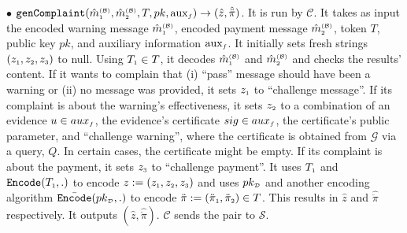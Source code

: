 \begin{definition}
\item  [$\bullet$] $\mathtt{genComplaint}(\hat m^{\scriptscriptstyle\mathcal{(B)}}_{\scriptscriptstyle 1}, \hat m^{\scriptscriptstyle\mathcal{(B)}}_{\scriptscriptstyle2}, T, pk, \text{aux}_{\scriptscriptstyle f})\rightarrow (\hat z, \hat{\ddot \pi})$. It is run by $\mathcal{C}$. It takes as input   the encoded warning message $\hat m^{\scriptscriptstyle\mathcal{(B)}}_{\scriptscriptstyle1}$, encoded payment message $\hat m^{\scriptscriptstyle\mathcal{(B)}}_{\scriptscriptstyle2}$,  token $T$, public key $pk$, and  auxiliary information $\text{aux}_{\scriptscriptstyle f}$. It initially sets fresh strings $(z_{\scriptscriptstyle 1}, z_{\scriptscriptstyle 2}, z_{\scriptscriptstyle 3})$ to null. Using $T_{\scriptscriptstyle 1}\in T$, it decodes  $\hat m^{\scriptscriptstyle\mathcal{(B)}}_{\scriptscriptstyle 1}$ and $\hat m^{\scriptscriptstyle\mathcal{(B)}}_{\scriptscriptstyle2}$ and checks the results' content. If it wants to complain that (i)   “pass” message should have been a warning  or (ii) no  message was provided,   it sets $z_{\scriptscriptstyle 1}$ to ``challenge message''. If its complaint is about the warning's effectiveness,  it sets $z_{\scriptscriptstyle 2}$ to a combination of an evidence $u\in aux_{\scriptscriptstyle f}$, the evidence's certificate $sig\in aux_{\scriptscriptstyle f}$, the certificate's public parameter,   and ``challenge warning'', where the certificate is obtained from  $\mathcal{G}$ via a query, $Q$. In certain cases, the certificate might be empty.  If its complaint is  about the   payment, it sets $z_{\scriptscriptstyle 3}$ to ``challenge payment''.  It uses $T_{\scriptscriptstyle 1}$ and  $\mathtt{Encode}(T_{\scriptscriptstyle 1}, .)$ to encode $z:=(z_{\scriptscriptstyle 1}, z_{\scriptscriptstyle 2}, z_{\scriptscriptstyle 3})$ and uses $pk_{\scriptscriptstyle\mathcal D}$ and another encoding algorithm  $\bar{\mathtt{Encode}}(pk_{\scriptscriptstyle\mathcal D}, .)$ to encode  $\ddot \pi:=(\ddot \pi_{\scriptscriptstyle 1},\ddot \pi_{\scriptscriptstyle 2})\in T$. This  results in $\hat z$ and $\hat {\ddot \pi}$ respectively. It outputs $(\hat z, \hat {\ddot \pi})$. $\mathcal{C}$ sends the pair to $\mathcal{S}$.
%

\end{definition}
